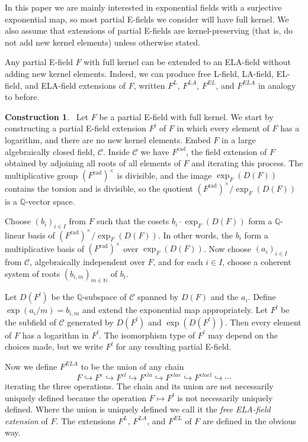 \documentclass[12pt]{amsart}
\theoremstyle{definition}
\newtheorem{construction}[prop]{Construction}
\begin{document}
 In this paper we are mainly interested in exponential fields with a surjective exponential map, so most partial E-fields we consider will have full kernel. We also assume that extensions of partial E-fields are kernel-preserving (that is, do not add new kernel elements) unless otherwise stated.

Any partial E-field $F$ with full kernel can be extended to an ELA-field without adding new kernel elements. Indeed, we can produce free L-field, LA-field, EL-field, and ELA-field extensions of $F$, written $F^{L}$, $F^{LA}$, $F^{EL}$, and $F^{ELA}$ in analogy to before.
\begin{construction}~\label{ELA-construction}
  Let $F$ be a partial E-field with full kernel. We start by constructing a partial E-field extension $F^l$ of $F$ in which every element of $F$ has a logarithm, and there are no new kernel elements. Embed $F$ in a large algebraically closed field, $\mathcal{C}$. Inside $\mathcal{C}$ we have $F^{\ensuremath{\mathrm{rad}}}$, the field extension of $F$ obtained by adjoining all roots of all elements of $F$ and iterating this process. The multiplicative group $(F^{\ensuremath{\mathrm{rad}}})^\times$ is divisible, and the image $\exp_F(D(F))$ contains the torsion and is divisible, so the quotient $(F^{\ensuremath{\mathrm{rad}}})^\times/\exp_F(D(F))$ is a ${\ensuremath{\mathbb{Q}}}$-vector space.

 Choose $(b_i)_{i \in I}$ from $F$ such that the cosets $b_i \cdot \exp_F(D(F))$ form a ${\ensuremath{\mathbb{Q}}}$-linear basis of $(F^{\ensuremath{\mathrm{rad}}})^\times/\exp_F(D(F))$. In other words, the $b_i$ form a multiplicative basis of $(F^{\ensuremath{\mathrm{rad}}})^\times$ over $\exp_F(D(F))$. Now choose $(a_i)_{i \in I}$ from $\mathcal{C}$, algebraically independent over $F$, and for each $i \in I$, choose a coherent system of roots $(b_{i,m})_{m \in {\ensuremath{\mathbb{N}}}}$ of $b_i$.

 Let $D(F^l)$ be the ${\ensuremath{\mathbb{Q}}}$-subspace of $\mathcal{C}$ spanned by $D(F)$ and the $a_i$. Define $\exp(a_i/m) = b_{i,m}$ and extend the exponential map appropriately. Let $F^l$ be the subfield of $\mathcal{C}$ generated by $D(F^l)$ and $\exp(D(F^l))$. Then every element of $F$ has a logarithm in $F^l$. The isomorphism type of $F^l$ may depend on the choices made, but we write $F^l$ for any resulting partial E-field.

Now we define $F^{ELA}$ to be the union of any chain
 \[F {\hookrightarrow} F^{e} {\hookrightarrow} F^{el} {\hookrightarrow} F^{ela} {\hookrightarrow} F^{elae} {\hookrightarrow} F^{elael} {\hookrightarrow}
  \cdots\] 
iterating the three operations. The chain and its union are not necessarily uniquely defined because the operation $F \mapsto F^l$ is not necessarily uniquely defined. Where the union is uniquely defined we call it the \emph{free ELA-field extension} of $F$. The extensions $F^{L}$, $F^{LA}$, and $F^{EL}$ of $F$ are defined in the obvious way.
\end{construction}
\end{document}
